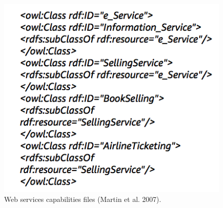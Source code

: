 \documentclass{article}
\begin{document}
\begin{figure}[h!]
\includegraphics{wscapabilities.png}
\caption{Web services capabilities files (Martin et al. 2007).}
\end{figure}
\end{document}
